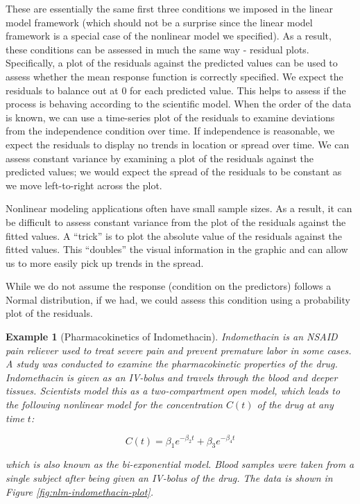 \documentclass[
]{book}
\theoremstyle{plain}
\theoremstyle{mydefn}
\theoremstyle{myexmpl}
\newtheorem{example}{Example}[chapter]
\theoremstyle{remark}
\begin{document}
These are essentially the same first three conditions we imposed in the linear model framework (which should not be a surprise since the linear model framework is a special case of the nonlinear model we specified). As a result, these conditions can be assessed in much the same way - residual plots. Specifically, a plot of the residuals against the predicted values can be used to assess whether the mean response function is correctly specified. We expect the residuals to balance out at 0 for each predicted value. This helps to assess if the process is behaving according to the scientific model. When the order of the data is known, we can use a time-series plot of the residuals to examine deviations from the independence condition over time. If independence is reasonable, we expect the residuals to display no trends in location or spread over time. We can assess constant variance by examining a plot of the residuals against the predicted values; we would expect the spread of the residuals to be constant as we move left-to-right across the plot.

\begin{rmdtip}
Nonlinear modeling applications often have small sample sizes. As a result, it can be difficult to assess constant variance from the plot of the residuals against the fitted values. A ``trick'' is to plot the absolute value of the residuals against the fitted values. This ``doubles'' the visual information in the graphic and can allow us to more easily pick up trends in the spread.
\end{rmdtip}

While we do not assume the response (condition on the predictors) follows a Normal distribution, if we had, we could assess this condition using a probability plot of the residuals.

\begin{example}[Pharmacokinetics of Indomethacin]
Indomethacin is an NSAID pain reliever used to treat severe pain and prevent premature labor in some cases. A study was conducted to examine the pharmacokinetic properties of the drug. Indomethacin is given as an IV-bolus and travels through the blood and deeper tissues. Scientists model this as a two-compartment open model, which leads to the following nonlinear model for the concentration \(C(t)\) of the drug at any time \(t\):

\[C(t) = \beta_1 e^{-\beta_2 t} + \beta_3 e^{-\beta_4 t}\]

which is also known as the bi-exponential model. Blood samples were taken from a single subject after being given an IV-bolus of the drug. The data is shown in Figure \ref{fig:nlm-indomethacin-plot}.
\end{example}
\end{document}
